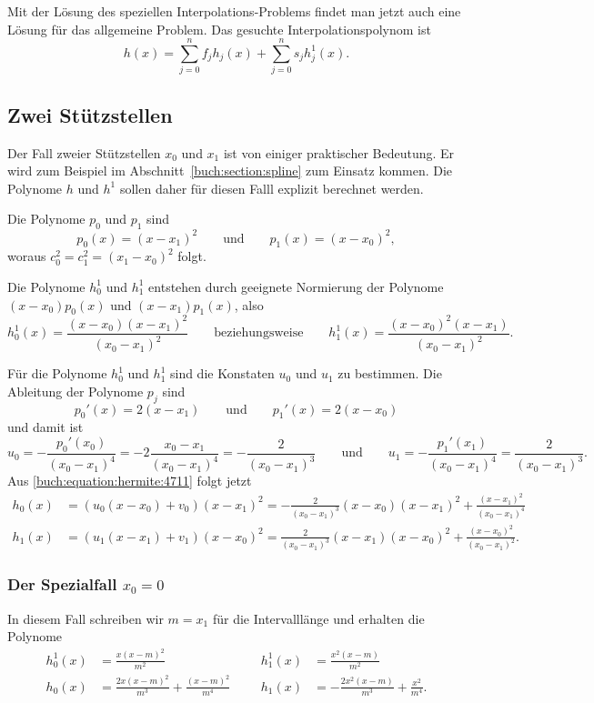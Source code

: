 Mit der Lösung des speziellen Interpolations-Problems findet man jetzt
auch eine Lösung für das allgemeine Problem.
Das gesuchte Interpolationspolynom ist
\[
h(x) 
=
\sum_{j=0}^n f_j h_j(x)
+
\sum_{j=0}^n s_j h^1_j(x).
\]

\subsection{Zwei Stützstellen
\label{buch:subsection:hermite:zweistuetzstellen}}
Der Fall zweier Stützstellen $x_0$ und $x_1$ ist von einiger praktischer
Bedeutung.
Er wird zum Beispiel im Abschnitt~\ref{buch:section:spline}
zum Einsatz kommen.
Die Polynome $h$ und $h^1$ sollen daher für diesen Falll explizit
berechnet werden.

Die Polynome $p_0$ und $p_1$ sind
\[
p_0(x) = (x-x_1)^2
\qquad\text{und}\qquad
p_1(x) = (x-x_0)^2,
\]
woraus $c_0^2 = c_1^2 = (x_1-x_0)^2$ folgt.

Die Polynome $h_0^1$ und $h_1^1$ entstehen durch geeignete Normierung
der Polynome $(x-x_0)p_0(x)$ und $(x-x_1)p_1(x)$, also
\[
h_0^1(x)
=
\frac{(x-x_0)(x-x_1)^2}{(x_0-x_1)^2}
\qquad\text{beziehungsweise}\qquad
h_1^1(x)
=
\frac{(x-x_0)^2(x-x_1)}{(x_0-x_1)^2}.
\]

Für die Polynome $h^1_0$ und $h^1_1$ sind die Konstaten $u_0$ und $u_1$
zu bestimmen.
Die Ableitung der Polynome $p_j$ sind
\[
p_0'(x) = 2(x-x_1)
\qquad\text{und}\qquad
p_1'(x) = 2(x-x_0)
\]
und damit ist
\[
u_0
=
-\frac{p_0'(x_0) }{(x_0-x_1)^4}
=
-2\frac{x_0-x_1}{(x_0-x_1)^4}
=
-\frac{2}{(x_0-x_1)^3}
\qquad\text{und}\qquad
u_1
=
-\frac{p_1'(x_1) }{(x_0-x_1)^4}
=
\frac{2}{(x_0-x_1)^3}.
\]
Aus \eqref{buch:equation:hermite:4711} folgt jetzt
\begin{align*}
h_0(x)
&=
(u_0(x-x_0)+v_0)(x-x_1)^2
=
-\frac{2}{(x_0-x_1)^3}(x-x_0)(x-x_1)^2 + \frac{(x-x_1)^2}{(x_0-x_1)^4}
\\
h_1(x)
&=
(u_1(x-x_1)+v_1)(x-x_0)^2
=
\frac{2}{(x_0-x_1)^3}(x-x_1)(x-x_0)^2 +\frac{(x-x_0)^2}{(x_0-x_1)^2}.
\end{align*}

\subsubsection{Der Spezialfall $x_0=0$}
In diesem Fall schreiben wir $m=x_1$ für die Intervalllänge und erhalten
die Polynome
\begin{equation}
\begin{aligned}
h_0^1(x) &= \frac{x(x-m)^2}{m^2}
&&&
h_1^1(x) &= \frac{x^2(x-m)}{m^2}
\\
h_0(x)   &= \frac{2x(x-m)^2}{m^3} +\frac{(x-m)^2}{m^4}
&&&
h_1(x)   &= -\frac{2x^2(x-m)}{m^3} +\frac{x^2}{m^4}.
\end{aligned}
\end{equation}
%
%
%
%

